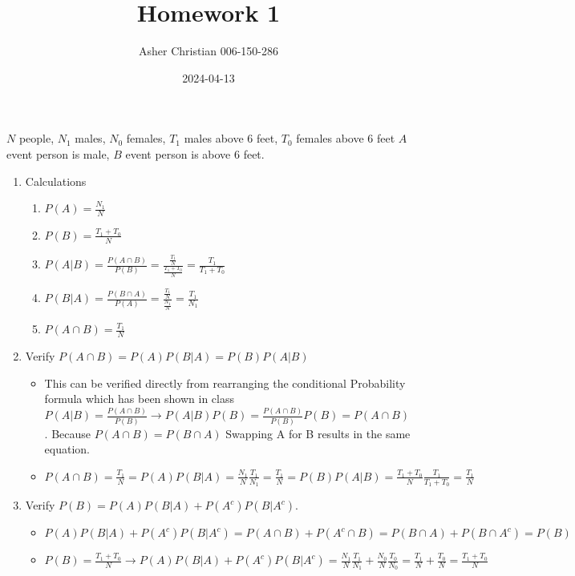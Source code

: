 \documentclass{article}
\title{Homework 1}
\author{Asher Christian 006-150-286}
\date{2024-04-13}
\begin{document}
    \maketitle
    \section{}
       $N$ people, $N_1$ males, $N_0$ females, $T_1$ males above 6 feet, $T_0$ females above 6 feet
       $A$ event person is male, $B$ event person is above 6 feet.
       \begin{enumerate}
           \item Calculations
           \begin{enumerate}
               \item $P(A) = \frac{N_1}{N}$
               \item $P(B) = \frac{T_1+T_0}{N}$
               \item $P(A|B) = \frac{P(A \cap B)}{P(B)} = \frac{\frac{T_1}{N}}{\frac{T_1+T_0}{N}} = \frac{T_1}{T_1+T_0}$
               \item $P(B|A) = \frac{P(B \cap A)}{P(A)} = \frac{\frac{T_1}{N}}{\frac{N_1}{N}} = \frac{T_1}{N_1}$
               \item $P(A \cap B) = \frac{T_1}{N}$
           \end{enumerate}
           \item Verify $P( A \cap B) = P(A)P(B|A) = P(B)P(A|B)$
           \begin{itemize}
            \item This can be verified directly from
              rearranging the conditional Probability formula which has been shown in class
               $P(A|B) = \frac{P(A \cap B)}{P(B)} \rightarrow P(A|B)P(B) = \frac{P(A \cap B)}{P(B)}P(B) = P(A \cap B)$. Because  $P(A \cap B) = P(B \cap A)$ Swapping A for B results in the same equation.
       \item $P(A \cap B) = \frac{T_1}{N} = P(A)P(B|A) = \frac{N_1}{N}\frac{T_1}{N_1} = \frac{T_1}{N} = P(B)P(A|B) = \frac{T_1+T_0}{N}\frac{T_1}{T_1+T_0} = \frac{T_1}{N}$
           \end{itemize}
           \item Verify $P(B) = P(A)P(B|A) + P(A^{c})P(B|A^{c})$.
           \begin{itemize}
               \item  $P(A)P(B|A) + P(A^{c})P(B|A^{c}) = P(A \cap B) + P(A^{c} \cap B) = P(B \cap A) + P(B \cap A^{c}) = P(B)$
           \item $P(B) =  \frac{T_1 + T_0}{N} \rightarrow P(A)P(B|A) + P(A^{c})P(B|A^{c})  = \frac{N_1}{N}\frac{T_1}{N_1} + \frac{N_0}{N}\frac{T_0}{N_0} = \frac{T_1}{N}+\frac{T_0}{N} = \frac{T_1+T_0}{N} $

\end{itemize}
\end{enumerate}
\end{document}
